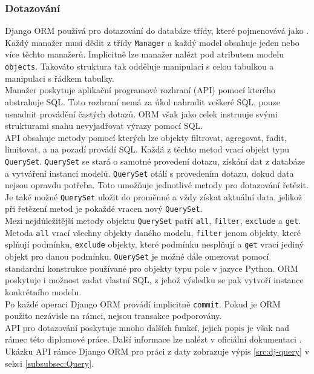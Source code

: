 \documentclass[ing,male,java,dept456]{diploma}						%
\begin{document}
\subsubsection{Dotazování}

Django ORM používá pro dotazování do databáze třídy, které pojmenovává jako . Každý manažer musí dědit z třídy \lstinline[style=custompython]|Manager| a každý model obsahuje jeden nebo více těchto manažerů. Implicitně lze manažer nalézt pod atributem modelu \lstinline[style=inlinepython]|objects|. Takováto struktura tak odděluje manipulaci s celou tabulkou a manipulaci s řádkem tabulky. \\
Manažer poskytuje aplikační programové rozhraní (API) pomocí kterého abstrahuje SQL. Toto rozhraní nemá za úkol nahradit veškeré SQL, pouze usnadnit provádění častých dotazů. ORM však jako celek instruuje svými strukturami snahu nevyjadřovat výrazy pomocí SQL. \\
API obsahuje metody pomocí kterých lze objekty filtrovat, agregovat, řadit, limitovat, a na pozadí provádí SQL. Každá z těchto metod vrací objekt typu \lstinline[style=inlinepython]|QuerySet|. \lstinline[style=inlinepython]|QuerySet| se stará o samotné provedení dotazu, získání dat z databáze a vytváření instancí modelů. \lstinline[style=inlinepython]|QuerySet| otálí s provedením dotazu, dokud data nejsou opravdu potřeba. Toto umožňuje jednotlivé metody pro dotazování řetězit. Je také možné \lstinline[style=inlinepython]|QuerySet| uložit do proměnné a vždy získat aktuální data, jelikož při řetězení metod je pokaždé vracen nový \lstinline[style=inlinepython]|QuerySet|. \\
Mezi nejdůležitější metody objektu \lstinline[style=inlinepython]|QuerySet| patří \lstinline[style=inlinepython]|all|, \lstinline[style=inlinepython]|filter|, \lstinline[style=inlinepython]|exclude| a \lstinline[style=inlinepython]|get|. Metoda \lstinline[style=inlinepython]|all| vrací všechny objekty daného modelu, \lstinline[style=inlinepython]|filter| jenom objekty, které splňují podmínku, \lstinline[style=inlinepython]|exclude| objekty, které podmínku nesplňují a \lstinline[style=inlinepython]|get| vrací jediný objekt pro danou podmínku.
\lstinline[style=inlinepython]|QuerySet| je možné dále omezovat pomocí standardní konstrukce používané pro objekty typu pole v jazyce Python. ORM poskytuje i možnost zadat vlastní SQL, z jehož výsledku se pak vytvoří instance konkrétního modelu. \\
Po každé operaci Django ORM provádí implicitně \lstinline[style=inlinepython]|commit|. Pokud je ORM použito nezávisle na rámci, nejsou transakce podporovány. \\
API pro dotazování poskytuje mnoho dalších funkcí, jejich popis je však nad rámec této diplomové práce. Další informace lze nalézt v oficiální dokumentaci \cite{djangodoc}. Ukázku API rámce Django ORM pro práci z daty zobrazuje výpis \ref{src:dj-query} v sekci \ref{subsubsec:Query}.
\end{document}
